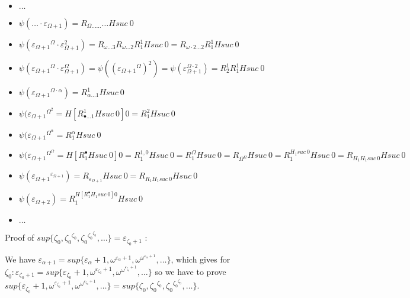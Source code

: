 \documentclass[10pt]{article}
\begin{document}
\begin{itemize}
\item \( \ldots \)

\item \( \psi(\ldots \cdot \varepsilon_{\Omega+1}) = R_{\Omega \ldots \ldots} \ldots H suc\ 0 \)

\item \( \psi({\varepsilon_{\Omega+1}}^\Omega \cdot \varepsilon_{\Omega+1}^2) = R_{\omega \ldots 3} R_{\omega \ldots 2} R^1_1 H suc\ 0 = R_{\omega \cdot 2 \ldots 2} R^1_1 H suc\ 0 \)

\item \( \psi({\varepsilon_{\Omega+1}}^\Omega \cdot \varepsilon_{\Omega+1}^\Omega) = \psi(({\varepsilon_{\Omega+1}}^\Omega)^2) = \psi(\varepsilon_{\Omega+1}^{\Omega \cdot 2}) = R^1_2 R^1_1 H suc\ 0 \)

\item \( \psi({\varepsilon_{\Omega+1}}^{\Omega \cdot \alpha}) = R^1_{\alpha \ldots 1} H suc\ 0 \)

\item \( \psi({\varepsilon_{\Omega+1}}^{\Omega^2} = H [R^1_{\bullet \ldots 1} H suc\ 0] 0 = R^2_1 H suc\ 0 \)

\item \( \psi({\varepsilon_{\Omega+1}}^{\Omega^\alpha} = R^\alpha_1 H suc\ 0 \)

\item \( \psi({\varepsilon_{\Omega+1}}^{\Omega^\Omega} = H [R^\bullet_1 H suc\ 0] 0 = R^{1,0}_1 H suc\ 0 = R^\Omega_1 H suc\ 0 = R_{\Omega^\Omega} H suc\ 0 = R^{H_1 suc\ 0}_1 H suc\ 0 = R_{H_1 H_1 suc\ 0} H suc\ 0 \)

\item \( \psi({\varepsilon_{\Omega+1}}^{\varepsilon_{\Omega+1}}) = R_{\varepsilon_{\Omega+1}} H suc\ 0 = R_{R_1 H_1 suc\ 0} H suc\ 0 \)

\item \( \psi({\varepsilon_{\Omega+2}}) = R^{H [R^\bullet_1 H_1 suc\ 0] 0}_1 H suc\ 0 \)

\item \( \ldots \)

\end{itemize}

Proof of \( sup \lbrace \zeta_0, {\zeta_0}^{\zeta_0}, {\zeta_0}^{{\zeta_0}^{\zeta_0}}, \ldots \rbrace = \varepsilon_{\zeta_0+1} \) :

We have \( \varepsilon_{\alpha+1} = sup \lbrace \varepsilon_\alpha+1, \omega^{\varepsilon_\alpha+1}, \omega^{\omega^{\varepsilon_\alpha+1}}, \ldots \rbrace \), which gives for \( \zeta_0 : \varepsilon_{\zeta_0+1} = sup \lbrace \varepsilon_{\zeta_0}+1, \omega^{\varepsilon_{\zeta_0}+1}, \omega^{\omega^{\varepsilon_{\zeta_0}+1}}, \ldots \rbrace \)
so we have to prove \( sup \lbrace \varepsilon_{\zeta_0}+1, \omega^{\varepsilon_{\zeta_0}+1}, \omega^{\omega^{\varepsilon_{\zeta_0}+1}}, \ldots \rbrace = sup \lbrace \zeta_0, {\zeta_0}^{\zeta_0}, {\zeta_0}^{{\zeta_0}^{\zeta_0}}, \ldots \rbrace \).
\end{document}
